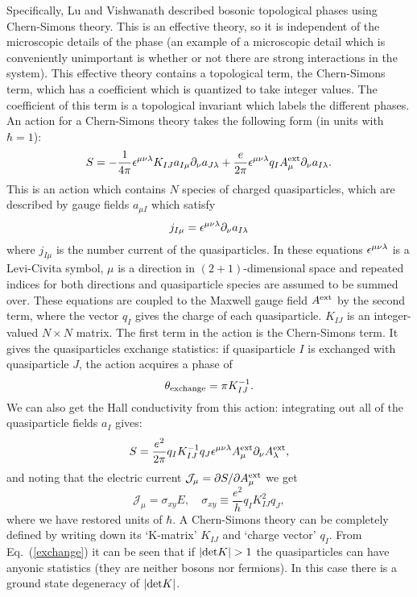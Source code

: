 Specifically, Lu and Vishwanath described bosonic topological phases using Chern-Simons theory. This is an effective theory, so it is independent of the microscopic details of the phase (an example of a microscopic detail which is conveniently unimportant is whether or not there are strong interactions in the system). This effective theory contains a topological term, the Chern-Simons term, which has a coefficient which is quantized to take integer values. The coefficient of this term is a topological invariant which labels the different phases. An action for a Chern-Simons theory takes the following form (in units with $\hbar=1$):\cite{Wen_book}
\begin{equation}
S=-\frac{1}{4\pi}\epsilon^{\mu\nu\lambda} K_{IJ}a_{I\mu}\partial_{\nu}a_{J\lambda} +\frac{e}{2\pi}\epsilon^{\mu\nu\lambda} q_IA^{\rm ext}_{\mu}\partial_\nu a_{I\lambda}.
\label{chernsimons}
\end{equation}
This is an action which contains $N$ species of charged quasiparticles, which are described by gauge fields $a_{\mu I}$ which satisfy 
\begin{equation}
j_{I\mu}=\epsilon^{\mu\nu\lambda} \partial_\nu a_{I\lambda}
\end{equation}
where $j_{I\mu}$ is the number current of the quasiparticles. In these equations $\epsilon^{\mu\nu\lambda}$ is a Levi-Civita symbol, $\mu$ is a direction in $(2+1)$-dimensional space and repeated indices for both directions and quasiparticle species are assumed to be summed over. These equations are coupled to the Maxwell gauge field $A^{\rm ext}$ by the second term, where the vector $q_I$ gives the charge of each quasiparticle. $K_{IJ}$ is an integer-valued $N\times N$ matrix. The first term in the action is the Chern-Simons term. It gives the quasiparticles exchange statistics: if quasiparticle $I$ is exchanged with quasiparticle $J$, the action acquires a phase of 
\begin{equation}
\theta_{\rm exchange}=\pi K_{IJ}^{-1}.
\label{exchange}
\end{equation}
 We can also get the Hall conductivity from this action: integrating out all of the quasiparticle fields $a_I$ gives:
\begin{equation}
S=\frac{e^2}{2\pi} q_I K_{IJ}^{-1} q_J \epsilon^{\mu\nu\lambda} A^{\rm ext}_\mu \partial_\nu A^{\rm ext}_\lambda,
\label{externalCS}
\end{equation}
and noting that the electric current $\mathcal{J}_\mu=\partial S/\partial A^{\rm ext}_\mu$ we get
\begin{equation}
\mathcal{J}_\mu=\sigma_{xy} E,\quad \sigma_{xy}\equiv \frac{e^2}{h}q_I K_{IJ}^2 q_J,
\end{equation}
where we have restored units of $\hbar$. A Chern-Simons theory can be completely defined by writing down its `K-matrix' $K_{IJ}$ and `charge vector' $q_I$. From Eq.~(\ref{exchange}) it can be seen that if $|{\rm det}K|>1$ the quasiparticles can have anyonic statistics (they are neither bosons nor fermions). In this case there is a ground state degeneracy of $|{\rm det}K|$. 

